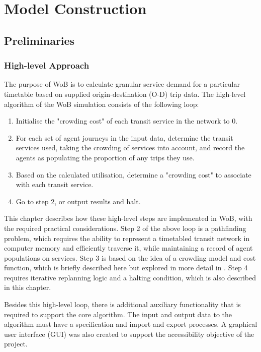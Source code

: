 \chapter{Model Construction}
\label{chap:ModelConstruction}

\section{Preliminaries}
\subsection{High-level Approach}
The purpose of WoB is to calculate granular service demand for a particular timetable based on supplied origin-destination (O-D) trip data. The high-level algorithm of the WoB simulation consists of the following loop:

\begin{SingleSpacing}
    \begin{enumerate}
        \item Initialise the "crowding cost" of each transit service in the network to 0.
        \item For each set of agent journeys in the input data, determine the transit services used, taking the crowding of services into account, and record the agents as populating the proportion of any trips they use.
        \item Based on the calculated utilisation, determine a "crowding cost" to associate with each transit service.
        \item Go to step 2, or output results and halt.
    \end{enumerate}
\end{SingleSpacing}

This chapter describes how these high-level steps are implemented in WoB, with the required practical considerations. Step 2 of the above loop is a pathfinding problem, which requires the ability to represent a timetabled transit network in computer memory and efficiently traverse it, while maintaining a record of agent populations on services. Step 3 is based on the idea of a crowding model and cost function, which is briefly described here but explored in more detail in . Step 4 requires iterative replanning logic and a halting condition, which is also described in this chapter.

Besides this high-level loop, there is additional auxiliary functionality that is required to support the core algorithm. The input and output data to the algorithm must have a specification and import and export processes. A graphical user interface (GUI) was also created to support the accessibility objective of the project.

